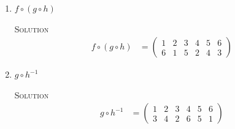 \documentclass[twoside]{amsart}
\newcommand{\solution}{\textsc{Solution}\xspace}
\begin{document}
\begin{enumerate}[A.]
\begin{enumerate}[1]
      \solution 
      \begin{align*}
         f^{-1} & = \begin{pmatrix}
	                1 & 2 & 3 & 4 & 5 & 6 \\
			2 & 6 & 3 & 5 & 4 & 1
	            \end{pmatrix} \\
         g^{-1} & = \begin{pmatrix}
	                1 & 2 & 3 & 4 & 5 & 6 \\
			3 & 1 & 2 & 6 & 5 & 4
	            \end{pmatrix} \\
         h^{-1} & = \begin{pmatrix}
	                1 & 2 & 3 & 4 & 5 & 6 \\
			2 & 6 & 1 & 4 & 5 & 3
	            \end{pmatrix} \\
         f \circ g & = \begin{pmatrix}
	                  1 & 2 & 3 & 4 & 5 & 6 \\
			  1 & 3 & 6 & 2 & 4 & 5
	               \end{pmatrix} \\
         g \circ f & = \begin{pmatrix}
	                  1 & 2 & 3 & 4 & 5 & 6 \\
			  4 & 2 & 1 & 5 & 6 & 3
	               \end{pmatrix}
      \end{align*}

      \item $f \circ (g \circ h)$

      \solution
      \begin{align*}
         f \circ (g \circ h) & = \begin{pmatrix}
	                            1 & 2 & 3 & 4 & 5 & 6 \\
				    6 & 1 & 5 & 2 & 4 & 3
	                         \end{pmatrix}
      \end{align*}

      \item $g \circ h^{-1}$

      \solution
      \begin{align*}
         g \circ h^{-1} & = \begin{pmatrix}
	                       1 & 2 & 3 & 4 & 5 & 6 \\
			       3 & 4 & 2 & 6 & 5 & 1
			    \end{pmatrix}
      \end{align*}


\end{enumerate}
\end{enumerate}
\end{document}
